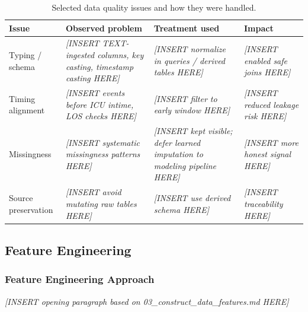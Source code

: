 \documentclass[12pt]{article}
\newcommand{\placeholder}[1]{\textit{[INSERT #1 HERE]}}
\begin{document}
\begin{table}[H]
\centering
\small
\caption{Selected data quality issues and how they were handled.}
\label{tab:cleaning_summary}
\begin{tabular}{@{}L{3.3cm}L{4.4cm}L{4.3cm}L{2.2cm}@{}}
\toprule
\textbf{Issue} & \textbf{Observed problem} & \textbf{Treatment used} & \textbf{Impact} \\
\midrule
Typing / schema & \placeholder{TEXT-ingested columns, key casting, timestamp casting} & \placeholder{normalize in queries / derived tables} & \placeholder{enabled safe joins} \\
Timing alignment & \placeholder{events before ICU intime, LOS checks} & \placeholder{filter to early window} & \placeholder{reduced leakage risk} \\
Missingness & \placeholder{systematic missingness patterns} & \placeholder{kept visible; defer learned imputation to modeling pipeline} & \placeholder{more honest signal} \\
Source preservation & \placeholder{avoid mutating raw tables} & \placeholder{use derived schema} & \placeholder{traceability} \\
\bottomrule
\end{tabular}
\end{table}

\subsection{Feature Engineering}
\label{subsec:feature_engineering}

%
%

\subsubsection*{Feature Engineering Approach}
\placeholder{opening paragraph based on 03\_construct\_data\_features.md}
\end{document}
